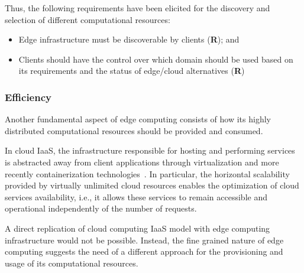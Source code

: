Thus, the following requirements have been elicited for the discovery and selection of different computational resources:


\begin{itemize}

	\item Edge infrastructure must be discoverable by clients (\textbf{R}); and

	\item Clients should have the control over which domain should be used based on its requirements and the status of edge/cloud alternatives (\textbf{R})

\end{itemize}


\subsubsection{Efficiency}

Another fundamental aspect of edge computing consists of how its highly distributed computational resources should be provided and consumed.

In cloud IaaS, the infrastructure responsible for hosting and performing services is abstracted away from client applications through virtualization and more recently containerization technologies~\cite{Quatrocchi2016discrete}. In particular, the horizontal scalability provided by virtually unlimited cloud resources enables the optimization of cloud services availability, i.e., it allows these services to remain accessible and operational independently of the number of requests.




A direct replication of cloud computing IaaS model with edge computing infrastructure would not be possible. Instead, the fine grained nature of edge computing suggests the need of a different approach for the provisioning and usage of its computational resources. 

